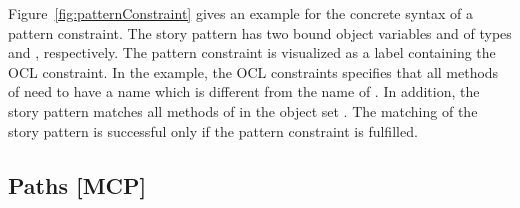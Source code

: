 {Figure~\ref{fig:patternConstraint} gives an example for the concrete syntax of a pattern constraint. The story pattern has two bound object variables  and  of types  and , respectively. The pattern constraint is visualized as a label containing the OCL constraint. In the example, the OCL constraints specifies that all methods of  need to have a name which is different from the name of . In addition, the story pattern matches all methods of  in the object set . The matching of the story pattern is successful only if the pattern constraint is fulfilled.

} %




\ext %
{ 
\subsection{Paths [MCP]}
\label{sec:StoryPatterns:paths}
} %



